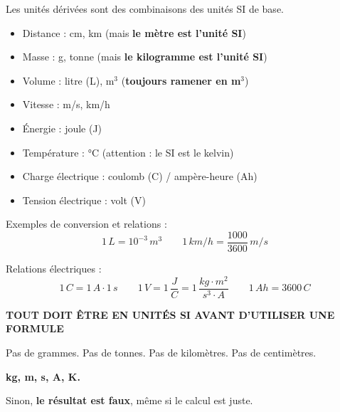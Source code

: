 \documentclass[11pt,a4paper]{article}
\newcommand{\theorybox}[2]{
\begin{tcolorbox}[title=\textbf{#1}]
#2
\end{tcolorbox}
}
\begin{document}
\theorybox{B - Unités dérivées courantes}{
Les unités dérivées sont des combinaisons des unités SI de base.

\begin{itemize}
\item Distance : cm, km (mais \textbf{le mètre est l’unité SI})
\item Masse : g, tonne (mais \textbf{le kilogramme est l’unité SI})
\item Volume : litre (L), m$^3$ (\textbf{toujours ramener en m$^3$})
\item Vitesse : m/s, km/h
\item Énergie : joule (J)
\item Température : °C (attention : le SI est le kelvin)
\item Charge électrique : coulomb (C) / ampère-heure (Ah)
\item Tension électrique : volt (V)

\end{itemize}

Exemples de conversion et relations :
\[
1\,\si{L} = 10^{-3}\,\si{m^3}
\qquad
1\,\si{km/h} = \frac{1000}{3600}\,\si{m/s}
\]

Relations électriques :
\[
1\,\si{C} = 1\,\si{A} \cdot 1\,\si{s}
\qquad
1\,\si{V} = 1\,\frac{\si{J}}{\si{C}} = 1\,\frac{kg \cdot m^2}{s^3 \cdot A}
\qquad
1\,\si{Ah} = 3600\,\si{C}
\]
}

\theorybox{C - RÈGLE ABSOLUE - UNITÉS SI}{
\centering
\textbf{\Large TOUT DOIT ÊTRE EN UNITÉS SI AVANT D’UTILISER UNE FORMULE}

\vspace{0.2cm}

Pas de grammes.  
Pas de tonnes.  
Pas de kilomètres.  
Pas de centimètres.  

\textbf{kg, m, s, A, K.}

Sinon, \textbf{le résultat est faux}, même si le calcul est juste.
}
\end{document}
